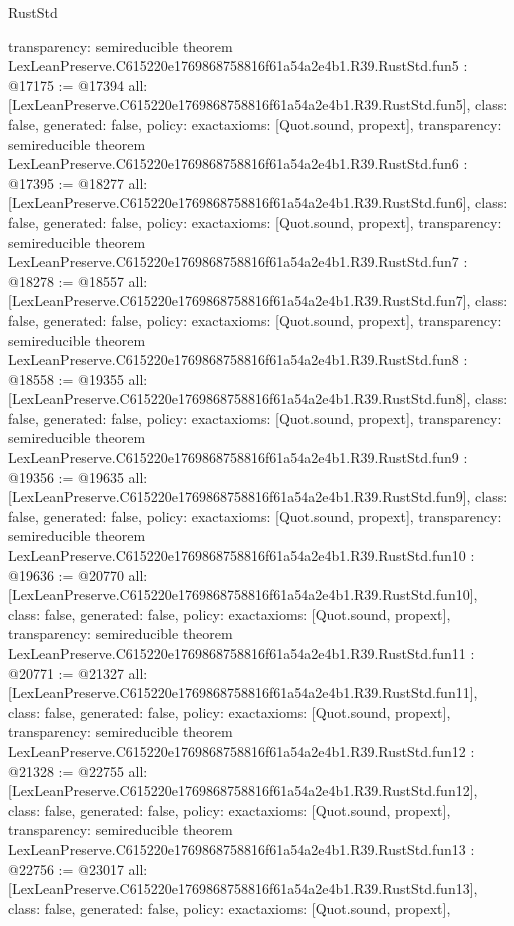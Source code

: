 \begin{lexlean}{RustStd}
\begin{coremodule}
{  transparency: semireducible
}
theorem LexLeanPreserve.C615220e1769868758816f61a54a2e4b1.R39.RustStd.fun5 : @17175 := @17394 {
  all: [LexLeanPreserve.C615220e1769868758816f61a54a2e4b1.R39.RustStd.fun5],
  class: false,
  generated: false,
  policy: exact{axioms: [Quot.sound, propext]},
  transparency: semireducible
}
theorem LexLeanPreserve.C615220e1769868758816f61a54a2e4b1.R39.RustStd.fun6 : @17395 := @18277 {
  all: [LexLeanPreserve.C615220e1769868758816f61a54a2e4b1.R39.RustStd.fun6],
  class: false,
  generated: false,
  policy: exact{axioms: [Quot.sound, propext]},
  transparency: semireducible
}
theorem LexLeanPreserve.C615220e1769868758816f61a54a2e4b1.R39.RustStd.fun7 : @18278 := @18557 {
  all: [LexLeanPreserve.C615220e1769868758816f61a54a2e4b1.R39.RustStd.fun7],
  class: false,
  generated: false,
  policy: exact{axioms: [Quot.sound, propext]},
  transparency: semireducible
}
theorem LexLeanPreserve.C615220e1769868758816f61a54a2e4b1.R39.RustStd.fun8 : @18558 := @19355 {
  all: [LexLeanPreserve.C615220e1769868758816f61a54a2e4b1.R39.RustStd.fun8],
  class: false,
  generated: false,
  policy: exact{axioms: [Quot.sound, propext]},
  transparency: semireducible
}
theorem LexLeanPreserve.C615220e1769868758816f61a54a2e4b1.R39.RustStd.fun9 : @19356 := @19635 {
  all: [LexLeanPreserve.C615220e1769868758816f61a54a2e4b1.R39.RustStd.fun9],
  class: false,
  generated: false,
  policy: exact{axioms: [Quot.sound, propext]},
  transparency: semireducible
}
theorem LexLeanPreserve.C615220e1769868758816f61a54a2e4b1.R39.RustStd.fun10 : @19636 := @20770 {
  all: [LexLeanPreserve.C615220e1769868758816f61a54a2e4b1.R39.RustStd.fun10],
  class: false,
  generated: false,
  policy: exact{axioms: [Quot.sound, propext]},
  transparency: semireducible
}
theorem LexLeanPreserve.C615220e1769868758816f61a54a2e4b1.R39.RustStd.fun11 : @20771 := @21327 {
  all: [LexLeanPreserve.C615220e1769868758816f61a54a2e4b1.R39.RustStd.fun11],
  class: false,
  generated: false,
  policy: exact{axioms: [Quot.sound, propext]},
  transparency: semireducible
}
theorem LexLeanPreserve.C615220e1769868758816f61a54a2e4b1.R39.RustStd.fun12 : @21328 := @22755 {
  all: [LexLeanPreserve.C615220e1769868758816f61a54a2e4b1.R39.RustStd.fun12],
  class: false,
  generated: false,
  policy: exact{axioms: [Quot.sound, propext]},
  transparency: semireducible
}
theorem LexLeanPreserve.C615220e1769868758816f61a54a2e4b1.R39.RustStd.fun13 : @22756 := @23017 {
  all: [LexLeanPreserve.C615220e1769868758816f61a54a2e4b1.R39.RustStd.fun13],
  class: false,
  generated: false,
  policy: exact{axioms: [Quot.sound, propext]},
}
\end{coremodule}
\end{lexlean}
